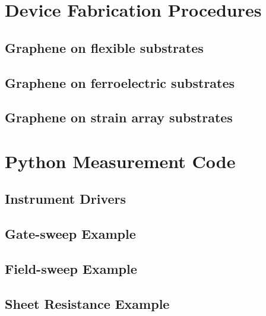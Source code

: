 \documentclass[edeposit,fullpage,draftthesis]{uiucthesis2009}
\begin{document}
\begin{appendices}

\chapter{Device Fabrication Procedures}
\label{appendix:fab}
\section{Graphene on flexible substrates}
\section{Graphene on ferroelectric substrates}
\section{Graphene on strain array substrates}

\chapter{Python Measurement Code}
\section{Instrument Drivers}
\section{Gate-sweep Example}
\section{Field-sweep Example}
\section{Sheet Resistance Example}

\end{appendices}

\backmatter



\end{document}
